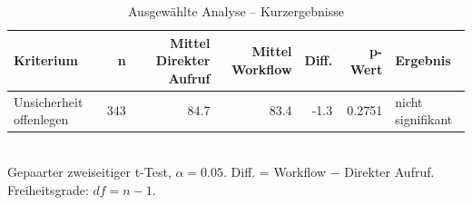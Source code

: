 \begin{table}[htbp]
\centering
\caption{Ausgewählte Analyse -- Kurzergebnisse}
\begin{tabular}{lrrrrrl}
\toprule
Kriterium & n & Mittel Direkter Aufruf & Mittel Workflow & Diff. & p-Wert & Ergebnis \\
\midrule
Unsicherheit offenlegen & 343 & 84.7 & 83.4 & -1.3 & 0.2751 & nicht signifikant \\
\bottomrule
\end{tabular}
\\[2mm]
\footnotesize Gepaarter zweiseitiger t-Test, $\alpha=0.05$. Diff. = Workflow $-$ Direkter Aufruf. Freiheitsgrade: $df=n-1$.
\end{table}
